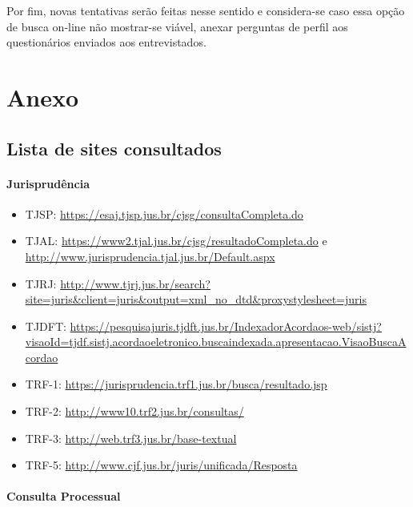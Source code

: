 \documentclass[12pt]{article}
\begin{document}
Por fim, novas tentativas serão feitas nesse sentido e considera-se caso
essa opção de busca on-line não mostrar-se viável, anexar perguntas de
perfil aos questionários enviados aos entrevistados.

\section{Anexo}\label{anexo}

\subsection{Lista de sites
consultados}\label{lista-de-sites-consultados}

\paragraph{Jurisprudência}\label{jurisprudencia}

\begin{itemize}
\item
  TJSP: \url{https://esaj.tjsp.jus.br/cjsg/consultaCompleta.do}
\item
  TJAL: \url{https://www2.tjal.jus.br/cjsg/resultadoCompleta.do} e
  \url{http://www.jurisprudencia.tjal.jus.br/Default.aspx}
\item
  TJRJ:
  \url{http://www.tjrj.jus.br/search?site=juris\&client=juris\&output=xml_no_dtd\&proxystylesheet=juris}
\item
  TJDFT:
  \url{https://pesquisajuris.tjdft.jus.br/IndexadorAcordaos-web/sistj?visaoId=tjdf.sistj.acordaoeletronico.buscaindexada.apresentacao.VisaoBuscaAcordao}
\item
  TRF-1: \url{https://jurisprudencia.trf1.jus.br/busca/resultado.jsp}
\item
  TRF-2: \url{http://www10.trf2.jus.br/consultas/}
\item
  TRF-3: \url{http://web.trf3.jus.br/base-textual}
\item
  TRF-5: \url{http://www.cjf.jus.br/juris/unificada/Resposta}
\end{itemize}

\paragraph{Consulta Processual}\label{consulta-processual}
\end{document}
